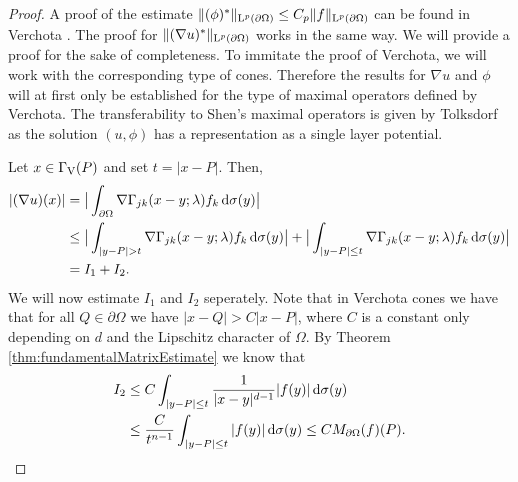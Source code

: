 \begin{proof}
  A proof of the estimate $\|(\phi)^*\|_{\mathrm{L}^p(\partial\Omega)} \leq C_p \|f\|_{\mathrm{L}^p(\partial\Omega)}$ can be found in Verchota \cite{verchota}.
  The proof for $\|(\nabla u)^*\|_{\mathrm{L}^p(\partial\Omega)}$ works in the same way. 
  We will provide a proof for the sake of completeness.
  To immitate the proof of Verchota, we will work with the corresponding type of cones.
  Therefore the results for $\nabla u$ and $\phi$ will at first only be established for the type of maximal operators defined by Verchota.
  The transferability to Shen's maximal operators is given by Tolksdorf \cite[p. 90ff.]{tolksdorf} as the solution $(u,\phi)$ has a representation as a single layer potential.

  Let $x \in \Gamma_\mathrm{V}(P)$ and set $t = |x - P|$.
  Then,
  \begin{align*}
    |(\nabla u)(x) |
    &= \big| \int_{\partial\Omega} \nabla \Gamma_{jk} (x - y; \lambda) f_k \, {\operatorname{d}\!{\sigma}}(y)\big| \\
    &\leq \big| \int_{|y - P| > t} \nabla\Gamma_{jk}(x - y; \lambda) f_k \, {\operatorname{d}\!{\sigma}}(y) \big| + \big| \int_{|y - P| \leq t} \nabla \Gamma_{jk}(x - y; \lambda) f_k \, {\operatorname{d}\!{\sigma}}(y)\big| \\
    &= I_1 + I_2.
  \end{align*}
  We will now estimate $I_1$ and $I_2$ seperately.
  Note that in Verchota cones we have that for all $Q \in \partial\Omega$ we have $|x - Q| > C |x - P|$, where $C$ is a constant only depending on $d$ and the Lipschitz character of $\Omega$.
  By Theorem \ref{thm:fundamentalMatrixEstimate} we know that
  \begin{align*}
    I_2 
    &\leq C \int_{|y - P| \leq t} \frac{1}{|x - y|^{d - 1}} |f(y)| \, {\operatorname{d}\!{\sigma}}(y) \\
    &\leq \frac{C}{t^{n - 1}} \int_{|y - P| \leq t} |f(y)| \, {\operatorname{d}\!{\sigma}}(y)
    \leq C M_{\partial\Omega} (f)(P).
  \end{align*}

\end{proof}
